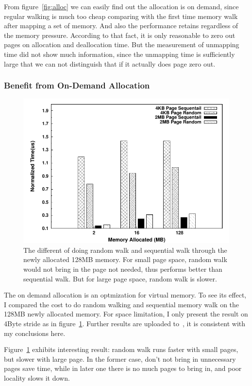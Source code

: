 From figure~\ref{fig:alloc} we can easily find out the allocation is on demand, since regular
walking is much too cheap comparing with the first time memory walk after
mapping a set of memory. And also the performance retains regardless of the
memory pressure. According to that fact, it is only reasonable to zero out
pages on allocation and deallocation time. But the measurement of unmapping
time did not show much information, since the unmapping time is sufficiently
large that we can not distinguish that if it actually does page zero out.

\subsubsection{Benefit from On-Demand Allocation}

\begin{figure}[htb]
\centering
\includegraphics[width=0.9\linewidth]{../figures/on_demand_4k}
\caption{The different of doing random walk and sequential walk through the 
newly allocated 128MB memory. For small page space, random walk would not bring
in the page not needed, thus performs better than sequential walk. But for
large page space, random walk is slower.}
\label{fig:on-demand}
\end{figure}

The on demand allocation is an optmization for virtual memory. To see its
effect, I compared the cost to do random walking and sequential memory walk
on the 128MB newly allocated memory. For space limitation, I only present the
result on 4Byte stride as in figure~\ref{fig:on-demand}. Further results are
uploaded to~\cite{github}, it is consistent with my conclusions here.

Figure~\ref{fig:on-demand} exhibits interesting result: random walk runs
faster with small pages, but slower with large page. In the former case,
don't not bring in unnecessary pages save time, while in later one there
is no much pages to bring in, and poor locality slows it down.

